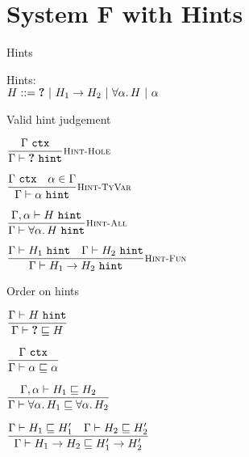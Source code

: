 \documentclass{beamer}
\begin{document}
\section{System F with Hints}

\newcommand{\fullvalidhint}[2]{#1 \vdash #2\ \texttt{hint}}
\newcommand{\validhint}[1]{\fullvalidhint{\Gamma}{#1}}

\begin{frame}{Hints}

Hints: \\
$H ::= \textbf{?} \ |\  H_1 \to H_2 \ |\  \forall \alpha.\, H \ |\  \alpha$

\end{frame}

\begin{frame}{Valid hint judgement}

\begin{center}
  $\infrule[Hint-Hole]{\tyctx{\Gamma}}{\validhint{\Hole}}$

  \vspace{2em}

  $\infrule[Hint-TyVar]{\tyctx{\Gamma} \quad \sidecond{\alpha \in \Gamma}}{\validhint{\alpha}}$

  \vspace{2em}

  $\infrule[Hint-All]{\fullvalidhint{\extendtype{\Gamma}{\alpha}}{H}}{\validhint{\ForallT{\alpha}{H}}}$

  \vspace{2em}

  $\infrule[Hint-Fun]{\validhint{H_1} \quad \validhint{H_2}}{\validhint{\Fun{H_1}{H_2}}}$
\end{center}

\end{frame}

\newcommand{\fullhintorderinctx}[3]{#1 \vdash \hintorder{#2}{#3}}
\newcommand{\hintorderinctx}[2]{\fullhintorderinctx{\Gamma}{#1}{#2}}

\begin{frame}{Order on hints}

\begin{center}
  $\infrule{\validhint{H}}{\hintorderinctx{\Hole}{H}}$

  \vspace{2em}

  $\infrule{\tyctx{\Gamma}}{\hintorderinctx{\alpha}{\alpha}}$

  \vspace{2em}

  $\infrule{\fullhintorderinctx{\extendtype{\Gamma}{\alpha}}{H_1}{H_2}}{\hintorderinctx{\ForallT{\alpha}{H_1}}{\ForallT{\alpha}{H_2}}}$

  \vspace{2em}

  $\infrule{\hintorderinctx{H_1}{H_1'} \quad \hintorderinctx{H_2}{H_2'}}{\hintorderinctx{\Fun{H_1}{H_2}}{\Fun{H'_1}{H'_2}}}$

\end{center}

\end{frame}
\end{document}
